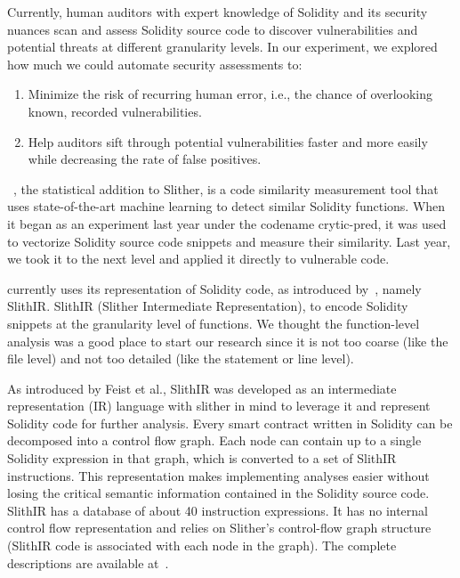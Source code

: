 Currently, human auditors with expert knowledge of Solidity and its security nuances scan and assess Solidity source code to discover vulnerabilities and potential threats at different granularity levels.
In our experiment, we explored how much we could automate security assessments to:
\begin{enumerate}
  \item Minimize the risk of recurring human error, i.e., the chance of overlooking known, recorded vulnerabilities.
  \item Help auditors sift through potential vulnerabilities faster and more easily while decreasing the rate of false positives.
\end{enumerate}

\slithersimil~\cite{slithersimil}, the statistical addition to Slither, is a code similarity measurement tool that uses state-of-the-art machine learning to detect similar Solidity functions.
When it began as an experiment last year under the codename crytic-pred, it was used to vectorize Solidity source code snippets and measure their similarity.
Last year, we took it to the next level and applied it directly to vulnerable code.

\slithersimil currently uses its representation of Solidity code, as introduced by~\cite{slither}, namely SlithIR.
SlithIR (Slither Intermediate Representation), to encode Solidity snippets at the granularity level of functions.
We thought the function-level analysis was a good place to start our research since
it is not too coarse (like the file level) and not too detailed (like the statement or line level).

As introduced by Feist et al., SlithIR was developed as an intermediate representation (IR) language with slither in mind to leverage it and represent Solidity code for further analysis.
Every smart contract written in Solidity can be decomposed into a control flow graph. Each node can contain up to a single Solidity expression in that graph, which is converted to a set of SlithIR instructions.
This representation makes implementing analyses easier without losing the critical semantic information contained in the Solidity source code.~\cite{slither}
SlithIR has a database of about 40 instruction expressions.
It has no internal control flow representation and relies on Slither's control-flow graph structure (SlithIR code is associated with each node in the graph).
The complete descriptions are available at~\cite{slithir}.

